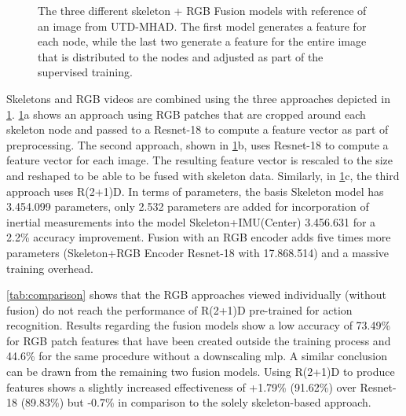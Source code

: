 \begin{figure}[!ht]
    \centering


    \caption[Skeleton + RGB Fusion Models]{The three different skeleton + RGB Fusion models with reference of an image from UTD-MHAD. The first model generates a feature for each node, while the last two generate a feature for the entire image that is distributed to the nodes and adjusted as part of the supervised training.}
    \label{fig:rgb-models}
\end{figure}

Skeletons and RGB videos are combined using the three approaches depicted in \figname\ref{fig:rgb-models}. \figname\ref{fig:rgb-models}a shows an approach using RGB patches that are cropped around each skeleton node and passed to a Resnet-18 to compute a feature vector  as part of preprocessing. 
The second approach, shown in \figname\ref{fig:rgb-models}b, uses Resnet-18 to compute a feature vector for each image. The resulting feature vector is rescaled to the size  and reshaped to be able to be fused with skeleton data. Similarly, in \figname\ref{fig:rgb-models}c, the third approach uses R(2+1)D.
In terms of parameters, the basis Skeleton model has 3.454.099 parameters, only 2.532 parameters are added for incorporation of inertial measurements into the model Skeleton+IMU(Center) 3.456.631 for a 2.2\% accuracy improvement. Fusion with an RGB
encoder adds five times more parameters (Skeleton+RGB Encoder Resnet-18 with 17.868.514) and a massive training overhead.






\tabname\ref{tab:comparison} shows that the RGB approaches viewed individually (without fusion) do not reach the performance of R(2+1)D pre-trained for action recognition. 
Results regarding the fusion models show a low accuracy of 73.49\% for RGB patch features that have been created outside the training process and 44.6\% for the same procedure without a downscaling \gls{mlp}.
A similar conclusion can be drawn from the remaining two fusion models. 
Using R(2+1)D to produce features shows a slightly increased effectiveness of +1.79\% (91.62\%) over Resnet-18 (89.83\%) but -0.7\% in comparison to the solely skeleton-based approach.

